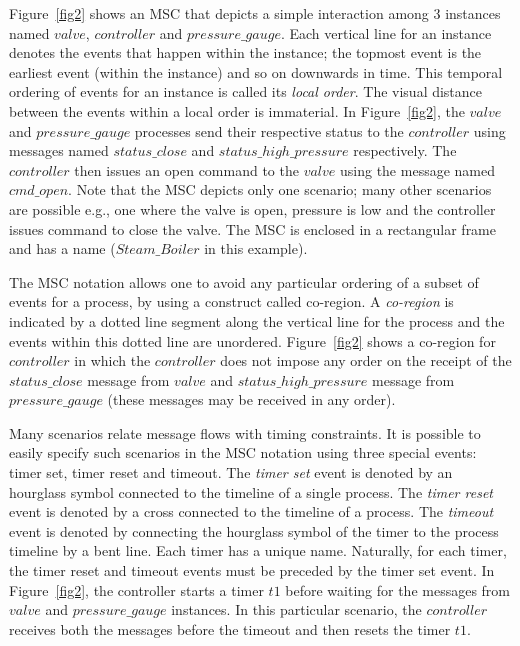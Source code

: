 \documentclass{entcs}
\begin{document}
Figure~\ref{fig2} shows an MSC that depicts a simple interaction 
among 3 instances named $valve$, $controller$ and 
$pressure\_gauge$. Each vertical line for an instance 
denotes the events that happen within the instance; the 
topmost event is the earliest event (within the 
instance) and so on downwards in time. This temporal 
ordering of events for an instance is called its 
{\em local order}. The visual distance between the 
events within a local order is immaterial. In Figure~\ref{fig2}, 
the $valve$ and $pressure\_gauge$ processes 
send their respective status to the $controller$ 
using messages named $status\_close$ and 
$status\_high\_pressure$ respectively. The $controller$ 
then issues an open command to the $valve$ using the 
message named $cmd\_open$. Note that the MSC depicts 
only one scenario; many other scenarios are possible 
e.g., one where the valve is open, pressure is 
low and the controller issues command to close the 
valve. The MSC is enclosed in a rectangular frame 
and has a name ($Steam\_Boiler$ in this example).

The MSC notation allows one to avoid any particular 
ordering of a subset of events for a process, by 
using a construct called co-region. A {\em co-region} 
is indicated by a dotted line segment along the 
vertical line for the process and the events within 
this dotted line are unordered. Figure~\ref{fig2} shows 
a co-region for $controller$ in which the $controller$ 
does not impose any order on the receipt of the 
$status\_close$ message from $valve$ and 
$status\_high\_pressure$ message from $pressure\_gauge$ 
(these messages may be received in any order).

Many scenarios relate message flows with timing 
constraints. It is possible to easily specify such 
scenarios in the MSC notation using three special 
events: timer set, timer reset and timeout. The 
{\em timer set} event is denoted by an hourglass 
symbol connected to the timeline of a single process. 
The {\em timer reset} event is denoted by a cross 
connected to the timeline of a process. The 
{\em timeout} event is denoted by connecting the 
hourglass symbol of the timer to the process timeline 
by a bent line. Each timer has a unique name. 
Naturally, for each timer, the timer reset and timeout 
events must be preceded by the timer set event. In 
Figure~\ref{fig2}, the controller starts a timer $t1$ before 
waiting for the messages from $valve$ and 
$pressure\_gauge$ instances. In this particular 
scenario, the $controller$ receives both the 
messages before the timeout and then resets the 
timer $t1$.
\end{document}
